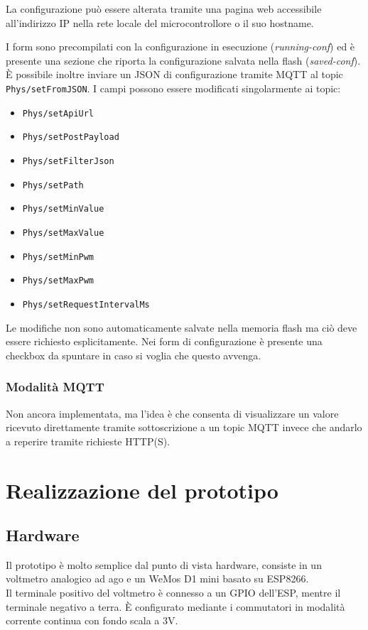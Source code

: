 \documentclass[12pt,a4paper]{report}
\begin{document}
La configurazione può essere alterata tramite una pagina web accessibile all'indirizzo IP nella rete locale del microcontrollore o il suo
hostname.


I form sono precompilati con la configurazione in esecuzione (\emph{running-conf}) ed è presente una sezione che riporta la configurazione
salvata nella flash (\emph{saved-conf}).\\
È possibile inoltre inviare un JSON di configurazione tramite MQTT al topic \texttt{Phys/setFromJSON}. I campi possono essere modificati
singolarmente ai topic:
\begin{itemize}
  \item \texttt{Phys/setApiUrl}
  \item \texttt{Phys/setPostPayload}
  \item \texttt{Phys/setFilterJson}
  \item \texttt{Phys/setPath}
  \item \texttt{Phys/setMinValue}
  \item \texttt{Phys/setMaxValue}
  \item \texttt{Phys/setMinPwm}
  \item \texttt{Phys/setMaxPwm}
  \item \texttt{Phys/setRequestIntervalMs}
\end{itemize}

Le modifiche non sono automaticamente salvate nella memoria flash ma ciò deve essere richiesto esplicitamente. Nei form di configurazione
è presente una checkbox da spuntare in caso si voglia che questo avvenga.


\subsection{Modalità MQTT}
Non ancora implementata, ma l'idea è che consenta di visualizzare un valore ricevuto direttamente tramite sottoscrizione a un topic MQTT
invece che andarlo a reperire tramite richieste HTTP(S).

\chapter{Realizzazione del prototipo}

\section{Hardware}
Il prototipo è molto semplice dal punto di vista hardware, consiste in un voltmetro analogico ad ago e un WeMos D1 mini basato su ESP8266.\\
Il terminale positivo del voltmetro è connesso a un GPIO dell'ESP, mentre il terminale negativo a terra. È configurato mediante i
commutatori in modalità corrente continua con fondo scala a 3V.
\end{document}
